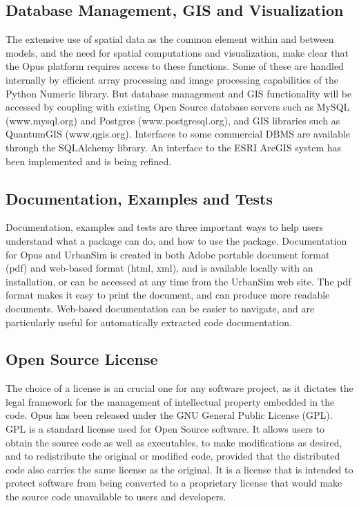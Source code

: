 \subsection{Database Management, GIS and Visualization}
The extensive use of spatial data as the common element within and between models, and the need for spatial computations and visualization, make clear that the Opus platform requires access to these functions.  Some of these are handled internally by efficient array processing and image processing capabilities of the Python Numeric library.  But database management and GIS functionality will be accessed by coupling with existing Open Source database servers such as MySQL (www.mysql.org) and Postgres (www.postgresql.org), and GIS libraries such as QuantumGIS (www.qgis.org).  Interfaces to some commercial DBMS are available through the SQLAlchemy library. An interface to the ESRI ArcGIS system has been implemented and is being refined.

\subsection{Documentation, Examples and Tests}
Documentation, examples and tests are three important ways to help users understand what a package can do, and how to use the package.  Documentation for Opus and UrbanSim is created in both Adobe portable document format (pdf) and web-based format (html, xml), and is available locally with an installation, or can be accessed at any time from the UrbanSim web site.  The pdf format makes it easy to print the document, and can produce more readable documents.  Web-based documentation can be easier to navigate, and are particularly useful for automatically extracted code documentation.

\subsection{Open Source License}
The choice of a license is an crucial one for any software project, as it dictates the legal framework for the management of intellectual property embedded in the code.  Opus has been released under the GNU General Public License (GPL).  GPL is a standard license used for Open Source software.  It allows users to obtain the source code as well as executables, to make modifications as desired, and to redistribute the original or modified code, provided that the distributed code also carries the same license as the original.  It is a license that is intended to protect software from being converted to a proprietary license that would make the source code unavailable to users and developers.

